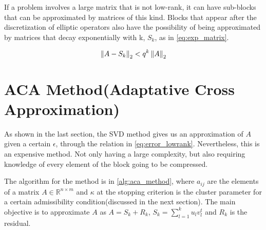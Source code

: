 If a problem involves a large matrix that is not low-rank, it can have sub-blocks that can be approximated by matrices of this kind. Blocks that appear after the discretization of elliptic operators also have the possibility of being approximated by matrices that decay exponentially with k, $S_{k}$, as in \ref{eq:exp_matrix}.

\begin{equation}\label{eq:exp_matrix}
    \left\lVert A-S_{k}\right\rVert_{2} < q^{k}\left\lVert A\right\rVert_{2}
\end{equation}




\section{ACA Method(Adaptative Cross Approximation)}

As shown in the last section, the SVD method gives us an approximation of $A$ given a certain $\epsilon$, through the relation in \ref{eq:error_lowrank}. Nevertheless, this is an expensive method. Not only having a large complexity, but also requiring knowledge of every element of the block going to be compressed.

The algorithm for the method is in \ref{alg:aca_method}, where $a_{ij}$ are the elements of a matrix $A \in \mathbb{R}^{n\times m}$ and $\kappa$ at the stopping criterion is the cluster parameter for a certain admissibility condition(discussed in the next section). The main objective is to approximate $A$ as $A=S_{k} + R_{k}$, $S_{k} = \sum_{l=1}^{k} u_{l}v_{l}^{t}$ and $R_{k}$ is the residual.



